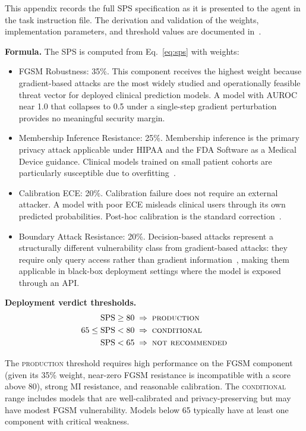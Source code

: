 \documentclass[11pt]{article}
\begin{document}
This appendix records the full SPS specification as it is presented to the
agent in the task instruction file. The derivation and validation of the
weights, implementation parameters, and threshold values are documented
in~\citet{eniolade2026security}.

\textbf{Formula.}
The SPS is computed from Eq.~\ref{eq:sps} with weights:
\begin{itemize}
\item FGSM Robustness: 35\%. This component receives the highest weight
because gradient-based attacks are the most widely studied and
operationally feasible threat vector for deployed clinical prediction models.
A model with AUROC near 1.0 that collapses to 0.5 under a single-step
gradient perturbation provides no meaningful security margin.

\item Membership Inference Resistance: 25\%. Membership inference is the
primary privacy attack applicable under HIPAA and the FDA Software as a
Medical Device guidance. Clinical models trained on small patient cohorts
are particularly susceptible due to overfitting~\citep{yeom2018privacy}.

\item Calibration ECE: 20\%. Calibration failure does not require an
external attacker. A model with poor ECE misleads clinical users through its
own predicted probabilities. Post-hoc calibration is the standard
correction~\citep{guo2017calibration,platt1999probabilistic}.

\item Boundary Attack Resistance: 20\%. Decision-based attacks represent
a structurally different vulnerability class from gradient-based attacks:
they require only query access rather than gradient
information~\citep{brendel2018decision}, making them applicable in black-box
deployment settings where the model is exposed through an API.
\end{itemize}

\textbf{Deployment verdict thresholds.}
\begin{align*}
\text{SPS} \geq 80 &\;\Rightarrow\; \textsc{production} \\
65 \leq \text{SPS} < 80 &\;\Rightarrow\; \textsc{conditional} \\
\text{SPS} < 65 &\;\Rightarrow\; \textsc{not recommended}
\end{align*}

The \textsc{production} threshold requires high performance on the FGSM
component (given its 35\% weight, near-zero FGSM resistance is incompatible
with a score above 80), strong MI resistance, and reasonable calibration.
The \textsc{conditional} range includes models that are well-calibrated and
privacy-preserving but may have modest FGSM vulnerability. Models below 65
typically have at least one component with critical weakness.
\end{document}
